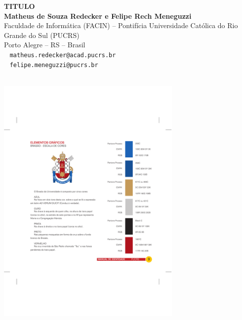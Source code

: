 \documentclass[a0,portrait]{a0poster}
\begin{document}
\begin{minipage}[b]{0.75\linewidth}
\veryHuge \color{NavyBlue} 
\textbf{TITULO} 
\color{Black}\\[2cm] %
\huge \textbf{Matheus de Souza Redecker e Felipe Rech Meneguzzi}\\
\Large Faculdade de Inform\'atica (FACIN) -- 
Pontif\'icia Universidade Cat\'olica do Rio Grande do Sul (PUCRS)\\ 
Porto Alegre -- RS -- Brasil\\ %
\Large \Letter ~ \texttt{matheus.redecker@acad.pucrs.br}\\
\Large \Letter ~ \texttt{felipe.meneguzzi@pucrs.br}\\
\\
\end{minipage}
\hspace*{-2cm}
\begin{minipage}[t]{0.25\linewidth}
\begin{center}
\vspace{-15cm}%
\includegraphics[width=9cm]{logoPUCRS.pdf}%
\hspace*{1cm}
\end{center}
\end{minipage}
\end{document}
